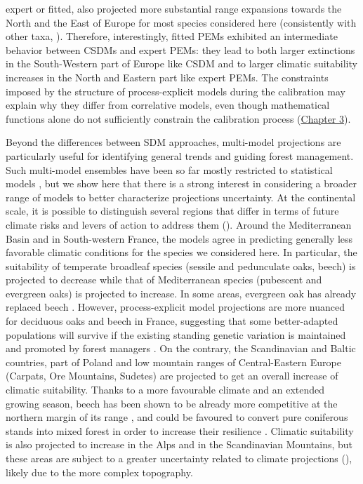 \documentclass[letterpaper,8pt]{article}  %
\begin{document}
\begin{doublespacing}
\begin{linenumbers}
expert or fitted, also projected more substantial range expansions towards the North and the East of Europe for most species considered here (consistently with other taxa, \citealp{Buckley2010}). Therefore, interestingly, fitted PEMs exhibited an intermediate behavior between CSDMs and expert PEMs: they lead to both larger extinctions in the South-Western part of Europe like CSDM and to larger climatic suitability increases in the North and Eastern part like expert PEMs. The constraints imposed by the structure of process-explicit models during the calibration may explain why they differ from correlative models, even though mathematical functions alone do not suﬀiciently constrain the calibration process (\hyperref[chapter3]{Chapter 3}).

Beyond the differences between SDM approaches, multi-model projections are particularly useful for identifying general trends and guiding forest management. Such multi-model ensembles have been so far mostly restricted to statistical models \citep{Simmonds2024}, but we show here that there is a strong interest in considering a broader range of models to better characterize projections uncertainty. At the continental scale, it is possible to distinguish several regions that differ in terms of future climate risks and levers of action to address them (). Around the Mediterranean Basin and in South-western France, the models agree in predicting generally less favorable climatic conditions for the species we considered here. In particular, the suitability of temperate broadleaf species (sessile and pedunculate oaks, beech) is projected to decrease while that of Mediterranean species (pubescent and evergreen oaks) is projected to increase. In some areas, evergreen oak has already replaced beech \citep{Penuelas2003}. However, process-explicit model projections are more nuanced for deciduous oaks and beech in France, suggesting that some better-adapted populations will survive if the existing standing genetic variation is maintained and promoted by forest managers \citep{Brang2014}. On the contrary, the Scandinavian and Baltic countries, part of Poland and low mountain ranges of Central-Eastern Europe (Carpats, Ore Mountains, Sudetes) are projected to get an overall increase of climatic suitability. Thanks to a more favourable climate and an extended growing season, beech has been shown to be already more competitive at the northern margin of its range \citep{Bolte2010}, and could be favoured to convert pure coniferous stands into mixed forest in order to increase their resilience \citep{Schauer2023}. Climatic suitability is also projected to increase in the Alps and in the Scandinavian Mountains, but these areas are subject to a greater uncertainty related to climate projections (), likely due to the more complex topography. 


\end{linenumbers}
\end{doublespacing}
\end{document}
